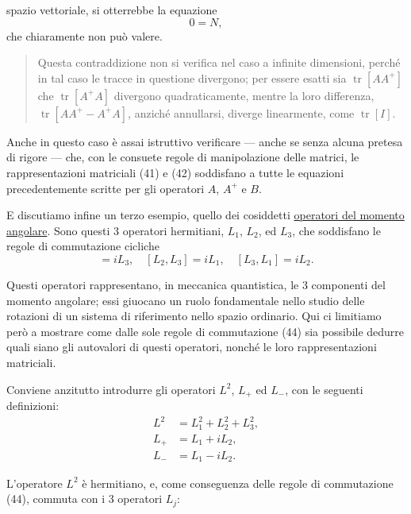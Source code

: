 \documentclass[11pt, a4paper]{book}
\numberwithin{equation}{section}
\begin{document}

spazio vettoriale, si otterrebbe la equazione
\begin{equation}
0 = N,
\end{equation}
che chiaramente non può valere.

\begin{quote}
Questa contraddizione non si verifica nel caso a infinite dimensioni,
perché in tal caso le tracce in questione divergono; per essere esatti sia
$\operatorname{tr}[AA^+]$ che $\operatorname{tr}[A^+A]$ divergono
quadraticamente, mentre la loro differenza,
$\operatorname{tr}[AA^+ - A^+A]$, anziché annullarsi, diverge
linearmente, come $\operatorname{tr}[I]$.
\end{quote}

Anche in questo caso è assai istruttivo verificare --- anche se senza
alcuna pretesa di rigore --- che, con le consuete regole di
manipolazione delle matrici, le rappresentazioni matriciali (41) e (42)
soddisfano a tutte le equazioni precedentemente scritte per gli operatori
$A$, $A^+$ e $B$.

E discutiamo infine un terzo esempio, quello dei cosiddetti
\underline{operatori del momento angolare}. Sono questi 3 operatori
hermitiani, $L_1$, $L_2$, ed $L_3$, che soddisfano le regole di
commutazione cicliche
\begin{equation}
[L_1, L_2] = iL_3, \quad [L_2, L_3] = iL_1, \quad [L_3, L_1] = iL_2.
\end{equation}

Questi operatori rappresentano, in meccanica quantistica, le 3 componenti
del momento angolare; essi giuocano un ruolo fondamentale nello studio
delle rotazioni di un sistema di riferimento nello spazio ordinario. Qui
ci limitiamo però a mostrare come dalle sole regole di commutazione (44)
sia possibile dedurre quali siano gli autovalori di questi operatori,
nonché le loro rappresentazioni matriciali.

Conviene anzitutto introdurre gli operatori $L^2$, $L_+$ ed $L_-$, con
le seguenti definizioni:
\begin{align}
L^2 &= L_1^2 + L_2^2 + L_3^2, \tag{45} \\
L_+ &= L_1 + iL_2,             \tag{46a} \\
L_- &= L_1 - iL_2.             \tag{46b}
\end{align}

L'operatore $L^2$ è hermitiano, e, come conseguenza delle regole di
commutazione (44), commuta con i 3 operatori $L_j$:
\end{document}

